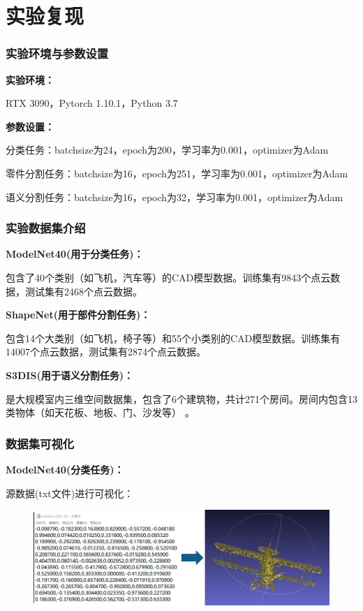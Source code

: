 \section{实验复现}

\begin{frame}
  \frametitle{实验环境与参数设置}

\textbf{实验环境：}

RTX 3090，Pytorch 1.10.1，Python 3.7


\textbf{参数设置：}

分类任务：batchsize为24，epoch为200，学习率为0.001，optimizer为Adam

零件分割任务：batchsize为16，epoch为251，学习率为0.001，optimizer为Adam

语义分割任务：batchsize为16，epoch为32，学习率为0.001，optimizer为Adam


\end{frame}


\begin{frame}
  \frametitle{实验数据集介绍}

\textbf{ModelNet40(用于分类任务)：}

包含了40个类别（如飞机，汽车等）的CAD模型数据。训练集有9843个点云数据，测试集有2468个点云数据。

\textbf{ShapeNet(用于部件分割任务)：}

包含14个大类别（如飞机，椅子等）和55个小类别的CAD模型数据。训练集有14007个点云数据，测试集有2874个点云数据。

\textbf{S3DIS(用于语义分割任务)：}

是大规模室内三维空间数据集，包含了6个建筑物，共计271个房间。房间内包含13类物体（如天花板、地板、门、沙发等） 。



\end{frame}


\begin{frame}
  \frametitle{数据集可视化}
\textbf{ModelNet40(分类任务)：}

源数据(txt文件)进行可视化：


\begin{figure}
\includegraphics[scale=0.4]{doc/img/f4.png}
\end{figure}



\end{frame}



